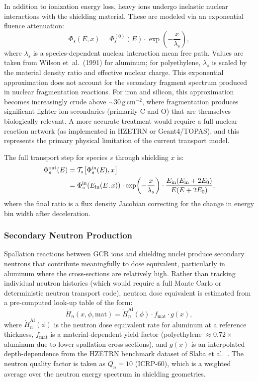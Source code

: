In addition to ionization energy loss, heavy ions undergo inelastic nuclear
interactions with the shielding material.
These are modeled via an exponential fluence attenuation:
\begin{equation}
  \Phi_s(E, x) = \Phi_s^{(0)}(E) \cdot \exp\!\left(-\frac{x}{\lambda_s}\right),
  \label{eq:attenuation}
\end{equation}
where $\lambda_s$ is a species-dependent nuclear interaction mean free path.
Values are taken from Wilson et~al.\ (1991) for aluminum; for polyethylene,
$\lambda_s$ is scaled by the material density ratio and effective nuclear charge.
This exponential approximation does not account for the secondary fragment
spectrum produced in nuclear fragmentation reactions.
For iron and silicon, this approximation becomes increasingly crude above
$\sim 30\,\mathrm{g\,cm^{-2}}$, where fragmentation produces significant
lighter-ion secondaries (primarily C and O) that are themselves biologically
relevant.
A more accurate treatment would require a full nuclear reaction network
(as implemented in HZETRN or Geant4/TOPAS), and this represents the
primary physical limitation of the current transport model.

The full transport step for species $s$ through shielding $x$ is:
\begin{align}
  \Phi_s^\mathrm{out}(E) &=
    \mathcal{T}_s\bigl[\Phi_s^\mathrm{in}(E), x\bigr] \notag \\
  &= \Phi_s^\mathrm{in}(E_\mathrm{in}(E, x)) \cdot
     \exp\!\left(-\frac{x}{\lambda_s}\right) \cdot
     \frac{E_\mathrm{in}(E_\mathrm{in} + 2E_0)}{E(E + 2E_0)},
  \label{eq:transport}
\end{align}
where the final ratio is a flux density Jacobian correcting for the change
in energy bin width after deceleration.

\subsubsection{Secondary Neutron Production}
\label{sec:neutrons}

Spallation reactions between GCR ions and shielding nuclei produce secondary
neutrons that contribute meaningfully to dose equivalent, particularly in
aluminum where the cross-sections are relatively high.
Rather than tracking individual neutron histories (which would require a
full Monte Carlo or deterministic neutron transport code), neutron
dose equivalent is estimated from a pre-computed look-up table of the form:
\begin{equation}
  \dot{H}_n(x, \phi, \mathrm{mat}) = \dot{H}_n^\mathrm{Al}(\phi) \cdot
  f_\mathrm{mat} \cdot g(x),
  \label{eq:neutron}
\end{equation}
where $\dot{H}_n^\mathrm{Al}(\phi)$ is the neutron dose equivalent rate for
aluminum at a reference thickness, $f_\mathrm{mat}$ is a material-dependent
yield factor (polyethylene $\approx 0.72\times$ aluminum due to lower spallation
cross-sections), and $g(x)$ is an interpolated depth-dependence from the
HZETRN benchmark dataset of Slaba et al.\ \cite{slaba2014}.
The neutron quality factor is taken as $Q_n = 10$ (ICRP-60), which is a
weighted average over the neutron energy spectrum in shielding geometries.


